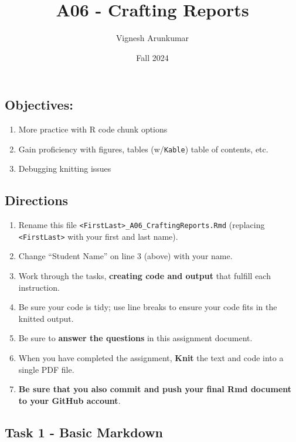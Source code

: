 \documentclass[
]{article}
\title{A06 - Crafting Reports}
\author{Vignesh Arunkumar}
\date{Fall 2024}
\providecommand{\tightlist}{%
  \setlength{\itemsep}{0pt}\setlength{\parskip}{0pt}}
\begin{document}
\maketitle

\subsection{Objectives:}\label{objectives}

\begin{enumerate}
\def\labelenumi{\arabic{enumi}.}
\tightlist
\item
  More practice with R code chunk options
\item
  Gain proficiency with figures, tables (w/\texttt{Kable}) table of
  contents, etc.
\item
  Debugging knitting issues
\end{enumerate}

\subsection{Directions}\label{directions}

\begin{enumerate}
\def\labelenumi{\arabic{enumi}.}
\tightlist
\item
  Rename this file
  \texttt{\textless{}FirstLast\textgreater{}\_A06\_CraftingReports.Rmd}
  (replacing \texttt{\textless{}FirstLast\textgreater{}} with your first
  and last name).
\item
  Change ``Student Name'' on line 3 (above) with your name.
\item
  Work through the tasks, \textbf{creating code and output} that fulfill
  each instruction.
\item
  Be sure your code is tidy; use line breaks to ensure your code fits in
  the knitted output.
\item
  Be sure to \textbf{answer the questions} in this assignment document.
\item
  When you have completed the assignment, \textbf{Knit} the text and
  code into a single PDF file.
\item
  \textbf{Be sure that you also commit and push your final Rmd document
  to your GitHub account}.
\end{enumerate}

\subsection{Task 1 - Basic Markdown}\label{task-1---basic-markdown}
\end{document}
